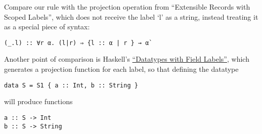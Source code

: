 \documentclass[11pt]{article}
\begin{document}
Compare our rule with the projection operation from ``Extensible Records
with Scoped Labels'', which does not receive the label `l' as a string,
instead treating it as a special piece of syntax:

\begin{verbatim}
(_.l) :: ∀r α. (l|r) ⇒ {l :: α | r } → α`
\end{verbatim}

Another point of comparison is Haskell's
\href{https://www.haskell.org/onlinereport/haskell2010/haskellch3.html\#x8-490003.15}{``Datatypes
with Field Labels''}, which generates a projection function for each
label, so that defining the datatype

\begin{verbatim}
data S = S1 { a :: Int, b :: String }
\end{verbatim}

will produce functions

\begin{verbatim}
a :: S -> Int
b :: S -> String
\end{verbatim}
\end{document}
